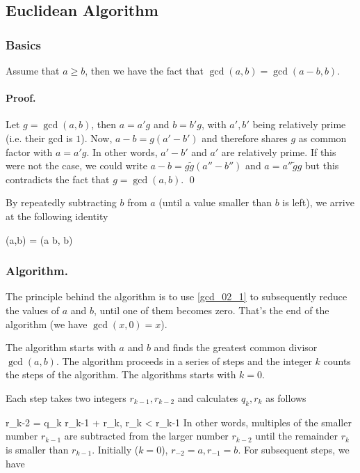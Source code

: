 

\subsection{Euclidean Algorithm}

\subsubsection{Basics}

\begin{theorem}
Assume that $a \geq b$, then we have the fact that $\gcd(a,b) = \gcd(a - b,b)$.
\end{theorem}

\paragraph{Proof.} Let $g = \gcd(a,b)$, then $a = a' g$ and $b = b' g$, with $a', b'$ being relatively prime (i.e. their gcd is $1$). Now, $a - b = g(a' - b')$ and therefore shares $g$ as common factor with $a = a'g$. In other words, $a' - b'$ and $a'$ are relatively prime. If this were not the case, we could write $a - b = g \tilde{g}(a'' - b'')$ and $a = a'' \tilde{g}g$ but this contradicts the fact that $g = \gcd(a,b)$. \qed

By repeatedly subtracting $b$ from $a$ (until a value smaller than $b$ is left), we arrive at the following identity

\be\label{gcd_02_1}
\gcd(a,b) = \gcd(a \bmod b, b)
\ee

\subsubsection{Algorithm.}

The principle behind the algorithm is to use \eqref{gcd_02_1} to subsequently reduce the values of $a$ and $b$, until one of them becomes zero. That's the end of the algorithm (we have $\gcd(x,0) = x$).

The algorithm starts with $a$ and $b$ and finds the greatest common divisor $\gcd(a,b)$. The algorithm proceeds in a series of steps and the integer $k$ counts the steps of the algorithm. The algorithms starts with $k=0$.

Each step takes two integers $r_{k-1}, r_{k-2}$ and calculates $q_k, r_k$ as follows

\bee
r_{k-2} = q_k r_{k-1} + r_k, \qquad r_k < r_{k-1}
\eee
%
In other words, multiples of the smaller number $r_{k-1}$ are subtracted from the larger number $r_{k-2}$ until the remainder $r_k$ is smaller than $r_{k-1}$.
%
Initially ($k=0$), $r_{-2} = a, r_{-1} = b$. For subsequent steps, we have


